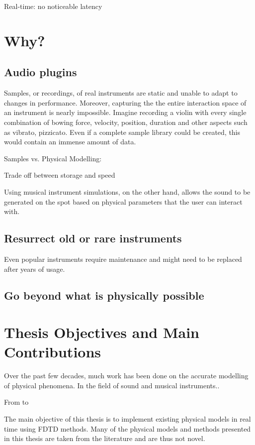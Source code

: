 Real-time: no noticeable latency

\section{Why?}
\subsection{Audio plugins} 
Samples, or recordings, of real instruments are static and unable to adapt to changes in performance. Moreover, capturing the the entire interaction space of an instrument is nearly impossible. Imagine recording a violin with every single combination of bowing force, velocity, position, duration and other aspects such as vibrato, pizzicato. Even if a complete sample library could be created, this would contain an immense amount of data.

Samples vs. Physical Modelling:

Trade off between storage and speed

Using musical instrument simulations, on the other hand, allows the sound to be generated on the spot based on physical parameters that the user can interact with. 

\subsection{Resurrect old or rare instruments}

Even popular instruments require maintenance and might need to be replaced after years of usage. 


\subsection{Go beyond what is physically possible} 


\section{Thesis Objectives and Main Contributions}
Over the past few decades, much work has been done on the accurate modelling of physical phenomena. In the field of sound and musical instruments.. 

From \cite{Fletcher1998} to \cite{Bilbao2019CMJb}



The main objective of this thesis is to implement existing physical models in real time using FDTD methods. Many of the physical models and methods presented in this thesis are taken from the literature and are thus not novel. 

